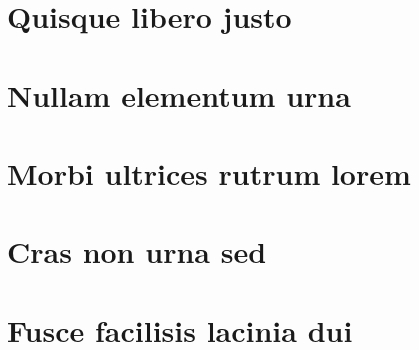 \documentclass[
	12pt,				%
	openright,			%
	oneside,			%
	a4paper,			%
	chapter=TITLE,		%
	english,			%
	french,				%
	spanish,			%
	brazil				%
	]{abntex2}
\theoremstyle{definition}
\begin{document}
\lipsum[31-33]

\postextual





\begin{apendicesenv}
	
	\partapendices
	
\chapter{Quisque libero justo}

\lipsum[50]

\chapter{Nullam elementum urna}
\lipsum[55-57]
	
\end{apendicesenv}


\begin{anexosenv}
	
	\partanexos
	
    \chapter{Morbi ultrices rutrum lorem}
    \lipsum[30]

    \chapter{Cras non urna sed}

    \lipsum[31]

    \chapter{Fusce facilisis lacinia dui}

    \lipsum[32]
	
\end{anexosenv}
\end{document}
